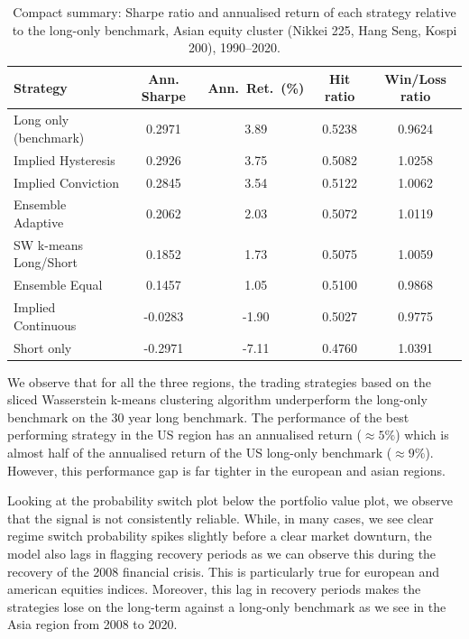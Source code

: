 \documentclass[12pt,a4paper]{report}
\begin{document}
\begin{table}[H]
\centering
\caption{Compact summary: Sharpe ratio and annualised return of each strategy
relative to the long-only benchmark, Asian equity cluster (Nikkei 225, Hang Seng, Kospi 200),
1990--2020.}
\label{tab:asia_equity_summary}
\small
\begin{tabular}{l S[table-format=-1.4] S[table-format=-2.2] S[table-format=-1.4] S[table-format=-1.4]}
\toprule
\textbf{Strategy} & {\textbf{Ann. Sharpe}} & {\textbf{Ann.\ Ret.\ (\%)}} & {Hit ratio}& {Win/Loss ratio} \\
\midrule
Long only (benchmark) & 0.2971 & 3.89 & {0.5238}  & {0.9624} \\
\midrule
Implied Hysteresis   & 0.2926 & 3.75 & 0.5082 & 1.0258 \\
Implied Conviction   & 0.2845 & 3.54 & 0.5122 & 1.0062 \\
Ensemble Adaptive & 0.2062 & 2.03 & 0.5072 & 1.0119 \\
SW k-means Long/Short & 0.1852 & 1.73  & 0.5075 & 1.0059 \\
Ensemble Equal      & 0.1457 & 1.05 & 0.5100 & 0.9868 \\
Implied Continuous   & -0.0283 & -1.90 & 0.5027 & 0.9775 \\
\midrule
Short only           & -0.2971 & -7.11 & {0.4760} & {1.0391} \\
\bottomrule
\end{tabular}
\end{table}

We observe that for all the three regions, the trading strategies based on the sliced Wasserstein k-means clustering algorithm underperform the long-only benchmark on the 30 year long benchmark.
The performance of the best performing strategy in the US region has an annualised return ($\approx 5\%$) which is almost half of the annualised return of the US long-only benchmark ($\approx 9\%$). 
However, this performance gap is far tighter in the european and asian regions.


Looking at the probability switch plot below the portfolio value plot, we observe that the signal is not consistently reliable.
While, in many cases, we see clear regime switch probability spikes slightly before a clear market downturn, the model also lags in flagging recovery periods as we can observe this during the recovery of the 2008 financial crisis. This is particularly true for european and american equities indices. 
Moreover, this lag in recovery periods makes the strategies lose on the long-term against a long-only benchmark as we see in the Asia region from 2008 to 2020.
\end{document}
